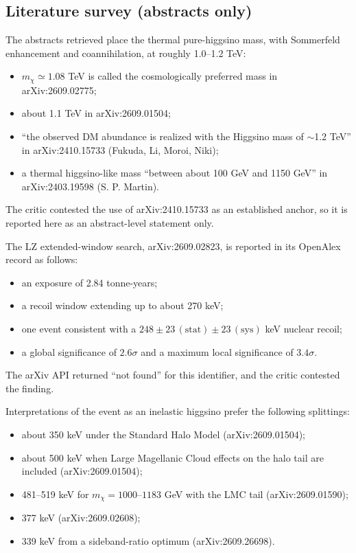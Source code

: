 \documentclass[11pt,a4paper]{article}
\begin{document}
\subsection{Literature survey (abstracts only)}
The abstracts retrieved place the thermal pure-higgsino mass, with Sommerfeld enhancement and coannihilation, at roughly 1.0--1.2 TeV:
\begin{itemize}
\item $m_\chi \simeq 1.08$ TeV is called the cosmologically preferred mass in arXiv:2609.02775;
\item about 1.1 TeV in arXiv:2609.01504;
\item ``the observed DM abundance is realized with the Higgsino mass of $\sim$1.2 TeV'' in arXiv:2410.15733 (Fukuda, Li, Moroi, Niki);
\item a thermal higgsino-like mass ``between about 100 GeV and 1150 GeV'' in arXiv:2403.19598 (S. P. Martin).
\end{itemize}
The critic contested the use of arXiv:2410.15733 as an established anchor, so it is reported here as an abstract-level statement only.

The LZ extended-window search, arXiv:2609.02823, is reported in its OpenAlex record as follows:
\begin{itemize}
\item an exposure of 2.84 tonne-years;
\item a recoil window extending up to about 270 keV;
\item one event consistent with a $248\pm23\,(\mathrm{stat})\pm23\,(\mathrm{sys})$ keV nuclear recoil;
\item a global significance of $2.6\sigma$ and a maximum local significance of $3.4\sigma$.
\end{itemize}
The arXiv API returned ``not found'' for this identifier, and the critic contested the finding.

Interpretations of the event as an inelastic higgsino prefer the following splittings:
\begin{itemize}
\item about 350 keV under the Standard Halo Model (arXiv:2609.01504);
\item about 500 keV when Large Magellanic Cloud effects on the halo tail are included (arXiv:2609.01504);
\item 481--519 keV for $m_\chi = 1000$--$1183$ GeV with the LMC tail (arXiv:2609.01590);
\item 377 keV (arXiv:2609.02608);
\item 339 keV from a sideband-ratio optimum (arXiv:2609.26698).
\end{itemize}
\end{document}
